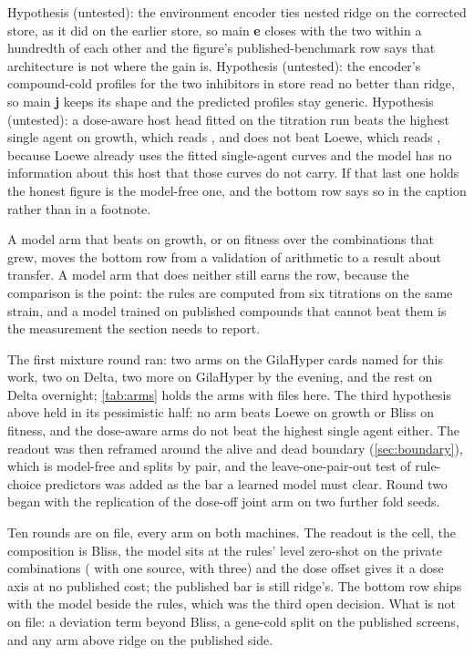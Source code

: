  Hypothesis (untested): the environment encoder ties
nested ridge on the corrected store, as it did on the earlier store, so main \textbf{e}
closes with the two within a hundredth of each other and the figure's published-benchmark
row says that architecture is not where the gain is. Hypothesis (untested): the encoder's
compound-cold profiles for the two inhibitors in store read no better than ridge, so main
\textbf{j} keeps its shape and the predicted profiles stay generic. Hypothesis
(untested): a dose-aware host head fitted on the titration run beats the highest single
agent on growth, which reads \hydhsaAuroc{}, and does not beat Loewe, which reads
\hydloeweAuroc{}, because Loewe already uses the fitted single-agent curves and the model
has no information about this host that those curves do not carry. If that last one holds
the honest figure is the model-free one, and the bottom row says so in the caption rather
than in a footnote.

 A model arm that beats
\hydloeweAuroc{} on growth, or \hydblissSpearman{} on fitness over the combinations that
grew, moves the bottom row from a validation of arithmetic to a result about transfer. A
model arm that does neither still earns the row, because the comparison is the point: the
rules are computed from six titrations on the same strain, and a model trained on
\hydnPoolCompounds{} published compounds that cannot beat them is the measurement the
section needs to report.

 The first mixture round ran: two arms on the GilaHyper
cards named for this work, two on Delta, two more on GilaHyper by the evening, and the
rest on Delta overnight; \cref{tab:arms} holds the arms with files here. The third
hypothesis above held in its pessimistic half: no arm beats Loewe on growth or Bliss on
fitness, and the dose-aware arms do not beat the highest single agent either. The
readout was then reframed around the alive and dead boundary (\cref{sec:boundary}),
which is model-free and splits by pair, and the leave-one-pair-out test of rule-choice
predictors was added as the bar a learned model must clear. Round two began with the
replication of the dose-off joint arm on two further fold seeds.

 Ten rounds are on file, every arm on both machines.
The readout is the cell, the composition is Bliss, the model sits at the rules' level
zero-shot on the private combinations (\hydrOneZerozsOnegrowthmean{} with one source,
\hydrOneZerozsThreegrowthmean{} with three) and the dose offset gives it a dose axis at
no published cost; the published bar is still ridge's. The bottom row ships with the model
beside the rules, which was the third open decision. What is not on file: a deviation
term beyond Bliss, a gene-cold split on the published screens, and any arm above ridge on
the published side.
